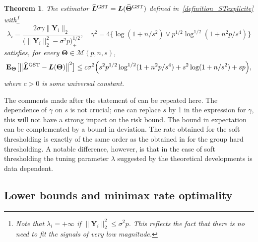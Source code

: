 \documentclass[sts,preprint,reqno,a4paper]{imsart}
\def\g{\gamma}
\def\l{\lambda}
\def\bxi{\boldsymbol\xi}
\def\bY{\boldsymbol Y\!}
\def\bL{\boldsymbol L}
\def\bfI{\mathbf I}
\def\bfT{\mathbf\Theta}
\def\esp{\mathbf E}
\def\calM{\mathcal M}
\def\simiid{\overset{\text{iid}}{\sim}}
\def\hat{\widehat}
\theoremstyle{plain}
\newtheorem{theorem}{Theorem}
\theoremstyle{remark}
\newtheorem{remark}{Remark}
\theoremstyle{definition}
\begin{document}
\begin{theorem}\label{theorem_ST}
	The estimator $\hat{\bL}{}^{\rm GST}=\bL(\hat{\bfT}^{\rm GST})$ defined
	in~\eqref{definition_STexplicite} with\footnote{Note that $\lambda_i=+\infty$
	if $\|\bY_i\|^2_2\le\sigma^2p$. This reflects
	the fact that there is no need to fit the signals of very low magnitude.}
	\begin{equation}
	\l_i = \frac{2\sigma\gamma\|\bY_i\|_2}{\big(\|\bY_i\|^2_2-\sigma^2p\big)_+^{1/2}}, \quad
	\gamma^2 = 
	4\big\{\log(1+n/s^2)\vee p^{1/2}\log^{1/2}(1+n^2p/s^4)
	\big\}
	\end{equation}
	satisfies, for every $\bfT\in\calM(p,n,s)$,
	\begin{equation}
	\esp_\bfT \big[\big\|\hat{\bL}{}^{\rm GST}-\bL(\bfT)\big\|^2 \big]
	\le c\sigma^2\Big(s^2p^{1/2}\log^{1/2}(1+n^2p/s^4)+s^2\log(1+n/s^2)+sp\Big),
	\end{equation}
	where $c>0$ is some universal constant.
\end{theorem}

The comments made after the statement of  can be repeated here.
The dependence of $\g$ on $s$ is not crucial; one can replace $s$ by 1 in the expression
for $\g$, this will not have a strong impact on the risk bound. The bound in expectation can be
complemented by a bound in deviation. The rate obtained for the soft thresholding is
exactly of the same order as the obtained in  for the group 
hard thresholding. A notable difference, however, is that in the case of soft thresholding the tuning
parameter $\l$ suggested by the theoretical developments is data dependent.


\subsection{Lower bounds and minimax rate optimality}\label{section_mmx}
\end{document}
